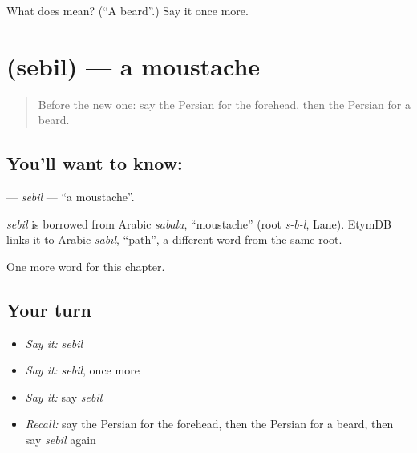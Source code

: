 \begin{tcolorbox}[breakable,colback=teal!4,colframe=teal!35!black,title={Before you move on}]
What does  mean? (\textquotedblleft{}A beard\textquotedblright{}.) Say it once more.
\end{tcolorbox}
\section[\texorpdfstring{\fa{سبیل} (sebil)}{سبیل (sebil)}]{ (sebil) — a moustache}

\label{lesson:FA-C123-sebil}



\begin{quote}
Before the new one: say the Persian for the forehead, then the Persian for a beard.
\end{quote}

\subsection*{You'll want to know: }
\textbf{} — \emph{sebil} — \textquotedblleft{}a moustache\textquotedblright{}.

\begin{cousinweb}
\emph{sebil} is borrowed from Arabic \emph{sabala}, \textquotedblleft{}moustache\textquotedblright{} (root \emph{s-b-l}, Lane). EtymDB links it to Arabic \emph{sabīl}, \textquotedblleft{}path\textquotedblright{}, a different word from the same root.
\end{cousinweb}

\begin{grammarlens}[title={What you've built}]
One more word for this chapter.
\end{grammarlens}

\subsection*{Your turn}
\begin{itemize}
\raggedright
  \item \emph{Say it:} \emph{sebil}
  \item \emph{Say it:} \emph{sebil}, once more
  \item \emph{Say it:} say \emph{sebil}
  \item \emph{Recall:} say the Persian for the forehead, then the Persian for a beard, then say \emph{sebil} again
\end{itemize}

